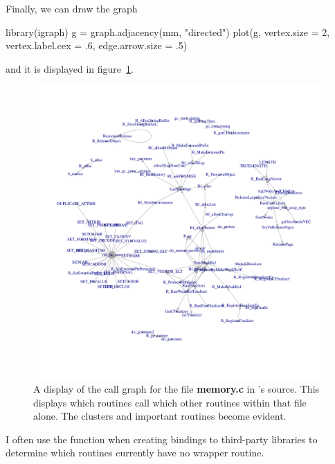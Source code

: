 \documentclass[article]{jss}
\def\R{\proglang{R}}
\def\Rpkg#1{\pkg{#1}}
\def\file#1{\textbf{#1}}
\begin{document}
Finally, we can draw the graph
\begin{RCode}
library(igraph)
g = graph.adjacency(mm, "directed")       
plot(g, vertex.size = 2, vertex.label.cex = .6, edge.arrow.size = .5)
\end{RCode}
and it is displayed in figure~\ref{fig:callgraph}.

\begin{figure}
\includegraphics[width=\textwidth,height=.9\textheight]{callgraph.pdf}
\caption{A display of the call graph for the file \file{memory.c} in
  \R's source. This displays which routines call which other routines
  within that file alone. The clusters and important routines become evident.}
  \label{fig:callgraph}
\end{figure}

I often use the \Rpkg{findCalls} function when creating bindings to
third-party libraries to determine which routines currently have no
wrapper routine.


\end{document}
